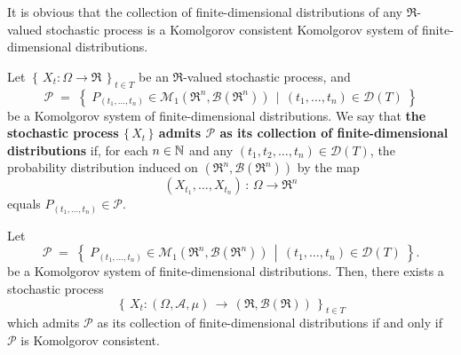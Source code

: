 \begin{remark}
\mbox{}\vskip 0cm
\noindent
It is obvious that the collection of finite-dimensional distributions of
any $\Re$-valued stochastic process is a
Komolgorov consistent Komolgorov system of finite-dimensional distributions.
\end{remark}

\begin{definition}
\mbox{}\vskip 0cm
\noindent
Let $\left\{\,X_{t}:\Omega\longrightarrow\Re\,\right\}_{t \in T}$ be an $\Re$-valued stochastic process, and
\begin{equation*}
\mathcal{P}
\; = \;
\left\{\;
P_{(t_{1},\ldots,t_{n})} \in \mathcal{M}_{1}\!\left(\Re^{n},\mathcal{B}(\Re^{n})\right)
\,\;\left\vert\;\,
(t_{1},\ldots,t_{n}) \in \mathcal{D}(T)
\right.
\;\right\}
\end{equation*}
be a Komolgorov system of finite-dimensional distributions.
We say that
\textbf{the stochastic process $\{\,X_{t}\,\}$ admits $\mathcal{P}$ as its collection of finite-dimensional distributions}
if, for each $n \in \mathbb{N}$ and any $(t_{1},t_{2},\ldots,t_{n}) \in \mathcal{D}(T)$,
the probability distribution induced on $\left(\Re^{n},\mathcal{B}(\Re^{n})\right)$ by the map
\begin{equation*}
(X_{t_{1}},\ldots,X_{t_{n}}) \,:\,\Omega\longrightarrow \Re^{n}
\end{equation*}
equals $P_{(t_{1},\ldots,t_{n})} \in \mathcal{P}$.
\end{definition}

\begin{theorem}
\mbox{}\vskip 0cm
\noindent
Let
\begin{equation*}
\mathcal{P}
\; = \;
\left\{\;\left.
P_{(t_{1},\ldots,t_{n})} \in \mathcal{M}_{1}\!\left(\Re^{n},\mathcal{B}(\Re^{n})\right)
\,\;\right\vert\;\,
(t_{1},\ldots,t_{n}) \in \mathcal{D}(T)
\;\right\}.
\end{equation*}
be a Komolgorov system of finite-dimensional distributions.
Then, there exists a stochastic process
\begin{equation*}
\left\{\,X_{t} : \left(\Omega,\mathcal{A},\mu\right) \,\longrightarrow\, \left(\Re,\mathcal{B}(\Re)\right)\,\right\}_{t\in T}
\end{equation*}
which admits $\mathcal{P}$ as its collection of finite-dimensional distributions
if and only if $\mathcal{P}$ is Komolgorov consistent.
\end{theorem}

